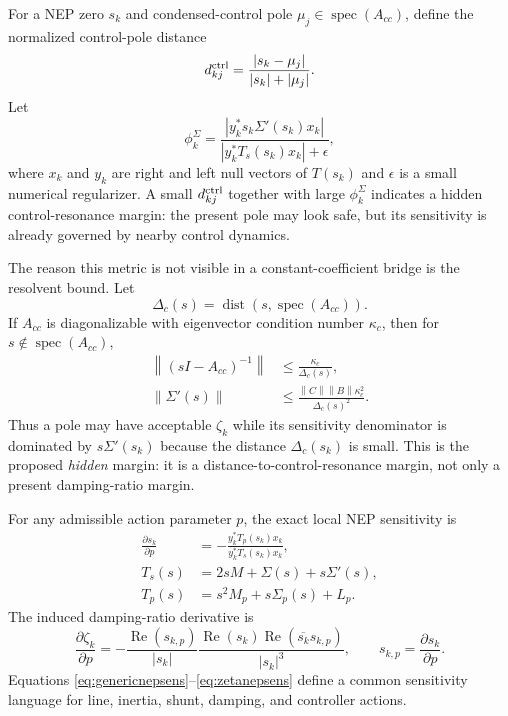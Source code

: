 \documentclass[journal]{IEEEtran}
\newcommand{\Real}{\operatorname{Re}}
\newcommand{\norm}[1]{\left\lVert #1 \right\rVert}
\begin{document}
For a NEP zero $s_k$ and condensed-control pole $\mu_j\in\operatorname{spec}(A_{cc})$, define the normalized control-pole distance
\begin{equation}
d_{kj}^{\rm ctrl}=
\frac{|s_k-\mu_j|}{|s_k|+|\mu_j|}.
\label{eq:hiddencontroldistance}
\end{equation}
Let
\begin{equation}
\phi_k^{\Sigma}=
\frac{\left|y_k^\ast s_k\Sigma'(s_k)x_k\right|}
{\left|y_k^\ast T_s(s_k)x_k\right|+\epsilon},
\label{eq:selfenergyfraction}
\end{equation}
where $x_k$ and $y_k$ are right and left null vectors of $T(s_k)$ and $\epsilon$ is a small numerical regularizer. A small $d_{kj}^{\rm ctrl}$ together with large $\phi_k^\Sigma$ indicates a hidden control-resonance margin: the present pole may look safe, but its sensitivity is already governed by nearby control dynamics.

The reason this metric is not visible in a constant-coefficient bridge is the resolvent bound. Let
\begin{equation}
\Delta_c(s)=\operatorname{dist}\!\left(s,\operatorname{spec}(A_{cc})\right).
\end{equation}
If $A_{cc}$ is diagonalizable with eigenvector condition number $\kappa_c$, then for $s\notin\operatorname{spec}(A_{cc})$,
\begin{align}
\norm{(sI-A_{cc})^{-1}}
&\le \frac{\kappa_c}{\Delta_c(s)},\nonumber\\
\norm{\Sigma'(s)}
&\le
\frac{\norm{C}\norm{B}\kappa_c^2}{\Delta_c(s)^2}.
\label{eq:resolventbound}
\end{align}
Thus a pole may have acceptable $\zeta_k$ while its sensitivity denominator is dominated by $s\Sigma'(s_k)$ because the distance $\Delta_c(s_k)$ is small. This is the proposed \emph{hidden} margin: it is a distance-to-control-resonance margin, not only a present damping-ratio margin.

For any admissible action parameter $p$, the exact local NEP sensitivity is
\begin{align}
\frac{\partial s_k}{\partial p}
&=
-\frac{y_k^\ast T_p(s_k)x_k}
{y_k^\ast T_s(s_k)x_k},
\label{eq:genericnepsens}\\
T_s(s)
&=2sM+\Sigma(s)+s\Sigma'(s),
\nonumber\\
T_p(s)
&=s^2M_p+s\Sigma_p(s)+L_p .
\nonumber
\end{align}
The induced damping-ratio derivative is
\begin{equation}
\frac{\partial\zeta_k}{\partial p}
=-\frac{\Real(s_{k,p})}{|s_k|}
\frac{\Real(s_k)\Real(\overline{s_k}s_{k,p})}{|s_k|^3},
\qquad
s_{k,p}=\frac{\partial s_k}{\partial p}.
\label{eq:zetanepsens}
\end{equation}
Equations \eqref{eq:genericnepsens}--\eqref{eq:zetanepsens} define a common sensitivity language for line, inertia, shunt, damping, and controller actions.
\end{document}
